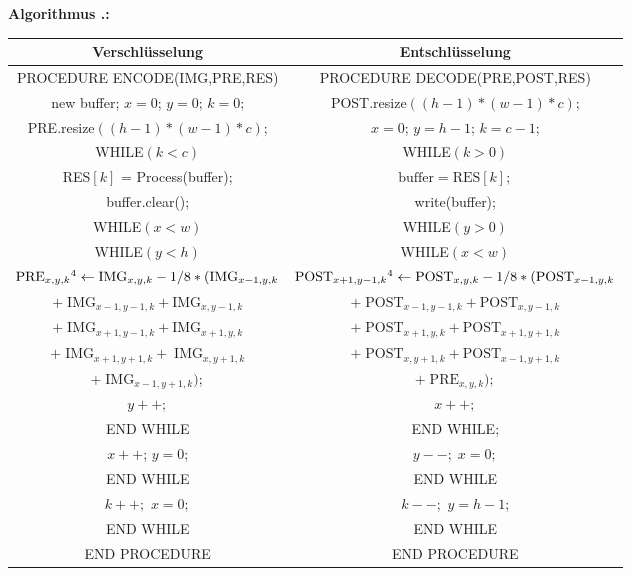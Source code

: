 \documentclass[a4paper,12pt]{article}
\newcounter{Algorithmus}
\newenvironment{Algorithmus}{
\medskip
        
        \setlength{\parindent}{0pt}
        \addtocounter{Algorithmus}{1}
        \textbf{\textsf{Algorithmus \thesubsection.\theAlgorithmus}:}}{
        \nopagebreak
        \vspace{-1.0ex}
        \bigskip
        
}
\begin{document}
\begin{Algorithmus}
\\
\begin{tabular}{c|c}
Verschlüsselung & Entschlüsselung
\\
\hline
PROCEDURE ENCODE(IMG,PRE,RES) & PROCEDURE DECODE(PRE,POST,RES)
\\
new buffer; $x=0$; $y=0$; $k=0$; & POST.resize$((h-1)*(w-1)*c)$;
\\
PRE.resize$((h-1)*(w-1)*c)$; & $x=0$; $y=h-1$; $k=c-1$;
\\
WHILE$(k < c)$ &                  WHILE$(k > 0)$
\\
RES$[k]$ = Process(buffer); &  $\text{buffer} = \text{RES}[k];$
\\
buffer.clear(); & write(buffer);
\\
WHILE$(x < w)$ &   WHILE$(y > 0)$          
\\
WHILE$(y < h)$ &   WHILE$(x<w)$     
\\
$\text{PRE}_{x,y,k}\footnotemark[4]\leftarrow \text{IMG}_{x,y,k} - 1/8 *(\text{IMG}_{x-1,y,k}$ &  $\text{POST}_{x+1,y-1,k}\footnotemark[4]\leftarrow \text{POST}_{x,y,k} - 1/8 *(\text{POST}_{x-1,y,k} $ 
\\
$+\;\text{IMG}_{x-1,y-1,k} + \text{IMG}_{x,y-1,k}$ & $+\;\text{POST}_{x-1,y-1,k} + \text{POST}_{x,y-1,k}$  
\\
$+\;\text{IMG}_{x+1,y-1,k} + \text{IMG}_{x+1,y,k}$ & $+\;\text{POST}_{x+1,y,k} + \text{POST}_{x+1,y+1,k}  $
\\
 $+\;\text{IMG}_{x+1,y+1,k} +\;\text{IMG}_{x,y+1,k}$    &   $+\;\text{POST}_{x,y+1,k} + \text{POST}_{x-1,y+1,k} $
\\
$+\;\text{IMG}_{x-1,y+1,k});$ & $+\;\text{PRE}_{x,y,k});$   
\\
$y++;$ & $x++;$
\\
END WHILE   & END WHILE;
\\
$x++$; $y=0$;    & $y--;\;x=0;$  
\\
END WHILE   & END WHILE 
\\
$k++;$ $x=0;$  &  $k--;$ $y=h-1$;
\\
END WHILE    &   END WHILE 
\\
END PROCEDURE & END PROCEDURE
\end{tabular}
\end{Algorithmus}
\end{document}
